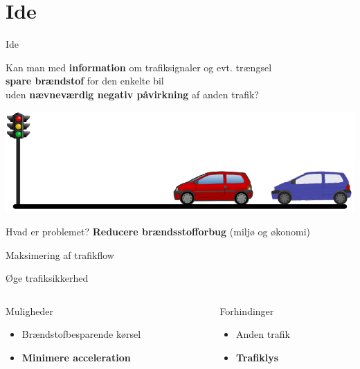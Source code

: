 \section{Ide}

\begin{frame}{Ide}
\begin{center}
Kan man med \textbf{information} om trafiksignaler og evt. trængsel\\\textbf{spare brændstof} for den enkelte bil\\uden \textbf{nævneværdig negativ påvirkning} af anden trafik?
\end{center}
\includegraphics[width=1\textwidth]{../images/idea.png}
\end{frame}

\begin{frame}{Hvad er problemet?}
\textbf{Reducere brændsstofforbug} (miljø og økonomi)

Maksimering af trafikflow

Øge trafiksikkerhed

\vspace{5mm}
\begin{columns}
\begin{column}{0.5\textwidth}
Muligheder
\begin{itemize}
\item Brændstofbesparende kørsel
\item \textbf{Minimere acceleration}
\end{itemize}

\end{column}
\begin{column}{0.4\textwidth}
Forhindinger
\begin{itemize}
\item Anden trafik
\item \textbf{Trafiklys}
\end{itemize}
\end{column}
\end{columns}
\end{frame}

